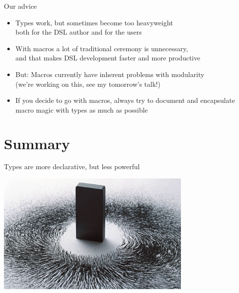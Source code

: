 \documentclass{beamer}
\begin{document}
\begin{frame}{Our advice}
  \begin{itemize}
  \item Types work, but sometimes become too heavyweight\\
        both for the DSL author and for the users
  \item With macros a lot of traditional ceremony is unnecessary,\\
        and that makes DSL development faster and more productive
  \item But: Macros currently have inherent problems with modularity\\
        (we're working on this, see my tomorrow's talk!)
  \item If you decide to go with macros, always try to document and encapsulate
        macro magic with types as much as possible
  \end{itemize}
\end{frame}

  \section{Summary}

\begin{frame}[fragile]{Types are more declarative, but less powerful}
  \begin{center}
    \includegraphics[height=6cm]{img/magnet.jpg}
  \end{center}
\end{frame}
\end{document}
